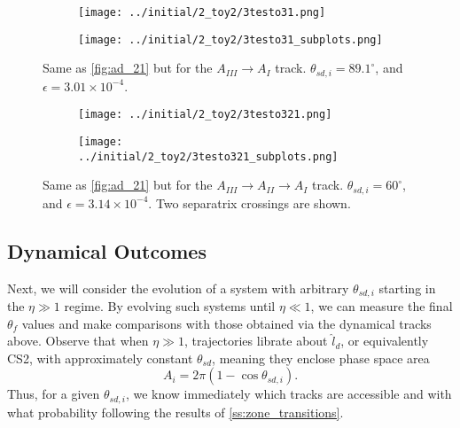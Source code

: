 \documentclass[
        fleqn,
        usenatbib,
    ]{mnras}
\newcommand*{\p}[1]{\left(#1\right)}
\begin{document}
\begin{figure}
    \centering
    \begin{subfigure}{\columnwidth}
        \centering
        \texttt{[image: ../initial/2\_toy2/3testo31.png]}
    \end{subfigure}
    \begin{subfigure}{\columnwidth}
        \centering
        \texttt{[image: ../initial/2\_toy2/3testo31\_subplots.png]}
    \end{subfigure}
    \caption{Same as \autoref{fig:ad_21} but for the $A_{III} \to A_I$
    track. $\theta_{sd, i} = 89.1^\circ$, and $\epsilon = 3.01 \times
    10^{-4}$.}\label{fig:ad_31}
\end{figure}
\begin{figure}
    \centering
    \begin{subfigure}{\columnwidth}
        \centering
        \texttt{[image: ../initial/2\_toy2/3testo321.png]}
    \end{subfigure}
    \begin{subfigure}{\columnwidth}
        \centering
        \texttt{[image: ../initial/2\_toy2/3testo321\_subplots.png]}
    \end{subfigure}
    \caption{Same as \autoref{fig:ad_21} but for the $A_{III} \to A_{II} \to A_I$
    track. $\theta_{sd, i} = 60^\circ$, and $\epsilon = 3.14 \times 10^{-4}$.
    Two separatrix crossings are shown.}\label{fig:ad_321}
\end{figure}

\subsection{Dynamical Outcomes}\label{ss:ad_ensemble}

Next, we will consider the evolution of a system with arbitrary $\theta_{sd, i}$
starting in the $\eta \gg 1$ regime. By evolving such systems until $\eta \ll
1$, we can measure the final $\theta_f$ values and make comparisons with those
obtained via the dynamical tracks above. Observe that when $\eta \gg 1$,
trajectories librate about $\hat{l}_d$, or equivalently CS2, with approximately
constant $\theta_{sd}$, meaning they enclose phase space area
\begin{equation}
    A_i = 2\pi\p{1 - \cos \theta_{sd, i}}.\label{eq:ai_qsd}
\end{equation}
Thus, for a given $\theta_{sd, i}$, we know immediately which tracks are
accessible and with what probability following the results of
\autoref{ss:zone_transitions}.
\end{document}
